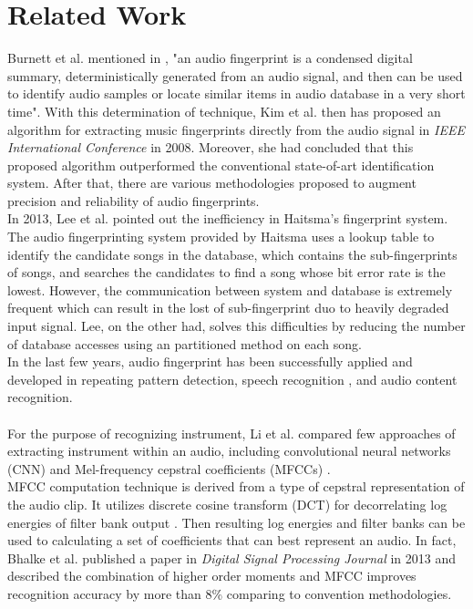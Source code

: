 \documentclass[whitelogo,12pt]{tudelft-report}
\begin{document}
\section{Related Work}
\label{relatedwork}
Burnett et al. mentioned in \cite{burnett2006}, "an audio fingerprint is a condensed digital summary, deterministically generated from an audio signal, and then can be used to identify audio samples or locate similar items in audio database in a very short time". With this determination of technique, Kim et al. then has proposed an algorithm for extracting music fingerprints directly from the audio signal in \textit{IEEE International Conference} in 2008\cite{kim2008}. Moreover, she had concluded that this proposed algorithm outperformed the conventional state-of-art identification system. After that, there are various methodologies proposed to augment precision and reliability of audio fingerprints.
\\
\indent In 2013, Lee et al. \cite{lee2013} pointed out the inefficiency in Haitsma's fingerprint system\cite{kalker2009}. The audio fingerprinting system provided by Haitsma uses a lookup table to identify the candidate songs in the database, which contains the sub-fingerprints of songs, and searches the candidates to find a song whose bit error rate is the lowest. However, the communication between system and database is extremely frequent which can result in the lost of sub-fingerprint duo to heavily degraded input signal. Lee, on the other had, solves this difficulties by reducing the number of database accesses using an partitioned method on each song.
\\
\indent In the last few years, audio fingerprint has been successfully applied and developed in repeating pattern detection\cite{chen2015}, speech recognition \cite{sharifi2015}, and audio content recognition\cite{jo2016}.
\\
\\
For the purpose of recognizing instrument, Li et al. compared few approaches of extracting instrument within an audio, including convolutional neural networks (CNN) and Mel-frequency cepstral coefficients (MFCCs) \cite{li2015}. 
\\
\indent MFCC computation technique is derived from a type of cepstral representation of the audio clip. It utilizes discrete cosine transform (DCT) for decorrelating log energies of filter bank output \cite{sahidullah2012}. Then resulting log energies and filter banks can be used to calculating a set of coefficients that can best represent an audio. In fact, Bhalke et al. published a paper in \textit{Digital Signal Processing Journal} in 2013 \cite{bhalke2013} and described the combination of higher order moments and MFCC improves recognition accuracy by more than 8\% comparing to convention methodologies.
\end{document}
